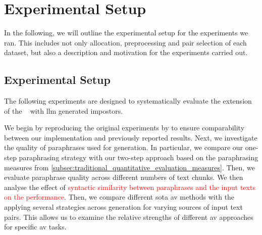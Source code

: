 \chapter{Experimental Setup}
\label{chap:experimental_setup}

In the following, we will outline the experimental setup for the experiments we ran.
This includes not only allocation, preprocessing and pair selection of each dataset, but also a description and motivation for the experiments carried out.






\section{Experimental Setup}
\label{sec:experimental_setup}

The following experiments are designed to systematically evaluate the extension of the \impAppr{}~\citep{koppel_determining_2014} with \ac{llm} generated impostors. 

We begin by reproducing the original experiments by \citet{koppel_determining_2014} to ensure comparability between our implementation and previously reported results. 
Next, we investigate the quality of paraphrases used for \imp{} generation. 
In particular, we compare our one-step paraphrasing strategy with our two-step approach based on the paraphrasing measures from \autoref{subsec:traditional_quantitative_evaluation_measures}. 
Then, we evaluate paraphrase quality across different numbers of text chunks.
We then analyse the effect of \textcolor{red}{syntactic similarity between paraphrases and the input texts on the \impAppr{} performance}. 
Then, we compare different \acl{sota} \ac{av} methods with the \impAppr{} applying several strategies across \imp{} generation for varying sources of input text pairs. 
This allows us to examine the relative strengths of different \ac{av} approaches for specific \ac{av} tasks.


















